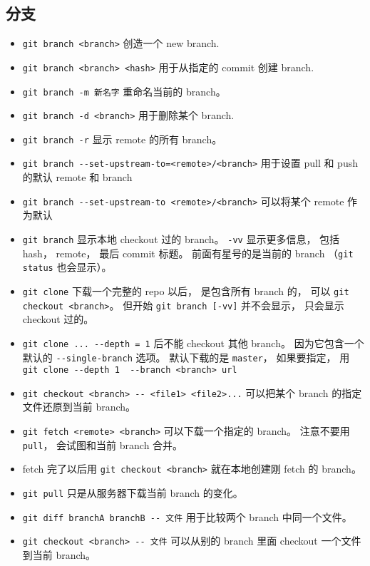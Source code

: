\subsection{分支}
\begin{itemize}
\item \verb`git branch <branch>` 创造一个 new branch.
\item \verb`git branch <branch> <hash>` 用于从指定的 commit 创建 branch.
\item \verb`git branch -m 新名字` 重命名当前的 branch。
\item \verb`git branch -d <branch>` 用于删除某个 branch.
\item \verb`git branch -r` 显示 remote 的所有 branch。
\item \verb`git branch --set-upstream-to=<remote>/<branch>` 用于设置 pull 和 push 的默认 remote 和 branch
\item \verb`git branch --set-upstream-to <remote>/<branch>` 可以将某个 remote 作为默认
\item \verb`git branch` 显示本地 checkout 过的 branch。 \verb`-vv` 显示更多信息， 包括 hash， remote， 最后 commit 标题。 前面有星号的是当前的 branch （\verb`git status` 也会显示）。
\item \verb`git clone` 下载一个完整的 repo 以后， 是包含所有 branch 的， 可以 \verb`git checkout <branch>`。 但开始 \verb`git branch [-vv]` 并不会显示， 只会显示 checkout 过的。
\item \verb`git clone ... --depth = 1` 后不能 checkout 其他 branch。 因为它包含一个默认的 \verb`--single-branch` 选项。 默认下载的是 \verb`master`， 如果要指定， 用 \verb`git clone --depth 1  --branch <branch> url`
\item \verb`git checkout <branch> -- <file1> <file2>...` 可以把某个 branch 的指定文件还原到当前 branch。
\item \verb`git fetch <remote> <branch>` 可以下载一个指定的 branch。 注意不要用 \verb`pull`， 会试图和当前 branch 合并。
\item fetch 完了以后用 \verb`git checkout <branch>` 就在本地创建刚 fetch 的 branch。
\item \verb`git pull` 只是从服务器下载当前 branch 的变化。
\item \verb`git diff branchA branchB -- 文件` 用于比较两个 branch 中同一个文件。
\item \verb`git checkout <branch> -- 文件` 可以从别的 branch 里面 checkout 一个文件到当前 branch。


\end{itemize}
